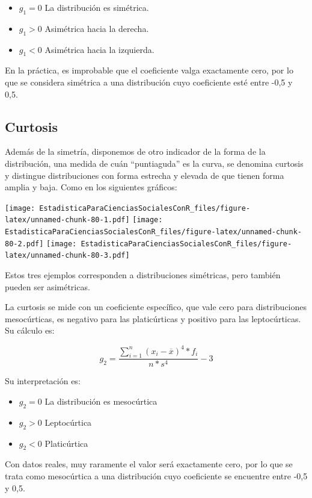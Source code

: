 \documentclass[]{book}
\begin{document}
\begin{itemize}
\item
  \(g_{1} = 0\) La distribución es simétrica.
\item
  \(g_{1} > 0\) Asimétrica hacia la derecha.
\item
  \(g_{1} < 0\) Asimétrica hacia la izquierda.
\end{itemize}

En la práctica, es improbable que el coeficiente valga exactamente cero,
por lo que se considera simétrica a una distribución cuyo coeficiente
esté entre -0,5 y 0,5.

\hypertarget{curtosis}{%
\subsection{Curtosis}\label{curtosis}}

Además de la simetría, disponemos de otro indicador de la forma de la
distribución, una medida de cuán ``puntiaguda'' es la curva, se denomina
curtosis y distingue distribuciones con forma estrecha y elevada de que
tienen forma amplia y baja. Como en los siguientes gráficos:

\texttt{[image: EstadisticaParaCienciasSocialesConR\_files/figure-latex/unnamed-chunk-80-1.pdf]} \texttt{[image: EstadisticaParaCienciasSocialesConR\_files/figure-latex/unnamed-chunk-80-2.pdf]} \texttt{[image: EstadisticaParaCienciasSocialesConR\_files/figure-latex/unnamed-chunk-80-3.pdf]}

Estos tres ejemplos corresponden a distribuciones simétricas, pero
también pueden ser asimétricas.

La curtosis se mide con un coeficiente específico, que vale cero para
distribuciones mesocúrticas, es negativo para las platicúrticas y
positivo para las leptocúrticas. Su cálculo es:

\[g_{2} = \frac{\sum_{i = 1}^{n}{\left( x_{i} - \overline{x} \right)^{4}*f_{i}}}{n*s^{4}} - 3\]

Su interpretación es:

\begin{itemize}
\item
  \(g_{2} = 0\) La distribución es mesocúrtica
\item
  \(g_{2} > 0\) Leptocúrtica
\item
  \(g_{2} < 0\) Platicúrtica
\end{itemize}

Con datos reales, muy raramente el valor será exactamente cero, por lo
que se trata como mesocúrtica a una distribución cuyo coeficiente se
encuentre entre -0,5 y 0,5.
\end{document}
